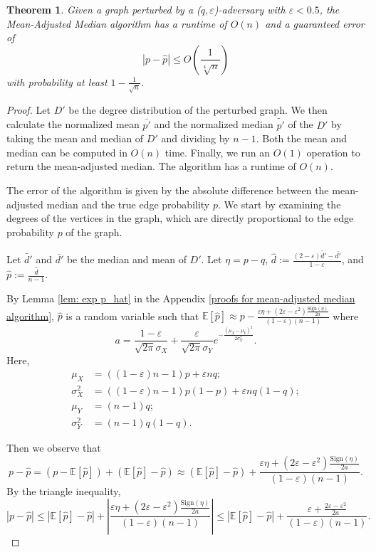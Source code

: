 \documentclass[10pt,onecolumn,letterpaper]{article}
\newtheorem{thm}{Theorem}[section]
\newcommand{\ee}{\mathbb{E}}
\newcommand{\eps}{\varepsilon}
\let\epsilon\varepsilon
\begin{document}
\begin{thm}
  \label{theorem: mean-adjusted-median}
  Given a graph perturbed by a (\(q,\epsilon\))-adversary with $\epsilon < 0.5$, the Mean-Adjusted Median algorithm has a runtime of \(O(n)\) and a guaranteed error of 
  \[|p - \hat{p}| \leq O\left(\frac{1}{\sqrt[4]{n}}\right)\] with probability at least $1-\frac{1}{\sqrt n}$.
\end{thm}
\begin{proof}
Let $D'$ be the degree distribution of the perturbed graph. We then calculate the normalized mean \(\bar{p'}\) and the normalized median \(\tilde{p'}\) of the $D'$ by taking the mean and median of \(D'\) and dividing by \(n-1\). Both the mean and median can be computed in \(O(n)\) time. Finally, we run an \(O(1)\) operation to return the mean-adjusted median. The algorithm has a runtime of \(O(n)\). 

The error of the algorithm is given by the absolute difference between the mean-adjusted median and the true edge probability \(p\). We start by examining the degrees of the vertices in the graph, which are directly proportional to the edge probability \(p\) of the graph. 

Let \(\tilde{d'}\) and \(\bar{d'}\) be the median and mean of $D'$. Let $\eta = p - q$, $\hat d := \frac{(2-\eps)\tilde{d'} - \bar{d'}}{1-\eps}$, and $\hat p := \frac{\hat d}{n-1}$.

By Lemma \ref{lem: exp p_hat} in the Appendix \ref{proofs for mean-adjusted median algorithm}, $\hat p$ is a random variable such that $\ee[\hat p] \approx p - \frac{\epsilon\eta + (2\eps - \eps^2)\frac{\mathrm{Sign}(\eta)}{2a}}{(1-\eps)(n-1)}$ where $$a = \frac{1-\eps}{\sqrt{2\pi}\sigma_X} + \frac{\eps}{\sqrt{2\pi}\sigma_Y}e^{-\frac{(\mu_X-\mu_Y)^2}{2\sigma_Y^2}}.$$ Here, \begin{align*}
    \mu_X &= ((1-\eps)n-1)p + \eps nq;\\
    \sigma_X^2 &= ((1-\eps)n-1)p(1-p) + \eps nq(1-q);\\
    \mu_Y &= (n-1)q;\\
    \sigma_Y^2 &= (n-1)q(1-q).
\end{align*}

Then we observe that $$p - \hat p = (p - \ee[\hat p]) + (\ee[\hat p] - \hat p) \approx (\ee[\hat p] -\hat p) + \frac{\epsilon\eta + (2\eps - \eps^2)\frac{\mathrm{Sign}(\eta)}{2a}}{(1-\eps)(n-1)}.$$ By the triangle inequality, $$|p - \hat p| \leq |\ee[\hat p] - \hat p| + \left|\frac{\eps\eta + (2\eps -\eps^2)\frac{\mathrm{Sign}(\eta)}{2a}}{(1-\eps)(n-1)}\right|\leq |\ee[\hat p] -\hat p| + \frac{\eps + \frac{2\eps-\eps^2}{2a}}{(1-\eps)(n-1)}.$$


\end{proof}
\end{document}
